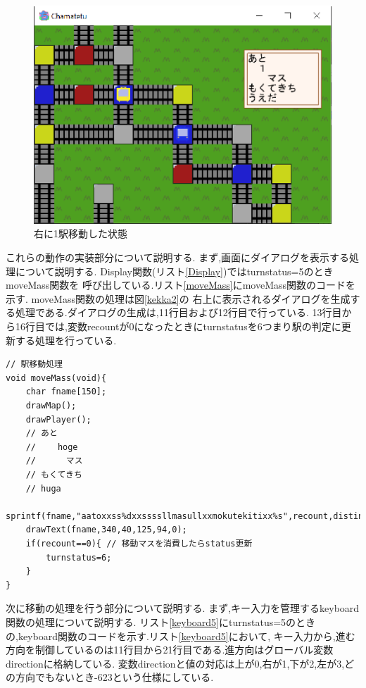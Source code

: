 \documentclass[a4j]{jarticle}
\begin{document}
    \begin{figure}[H]
        \centering
        \includegraphics[scale=1.3]{kekkamigi.eps}
        \caption{右に1駅移動した状態}
         \label{kekkamigi}
        \end{figure} 

    これらの動作の実装部分について説明する. まず,画面にダイアログを表示する処理について説明する. Display関数(リスト\ref{Display})ではturnstatus=5のときmoveMass関数を
    呼び出している.リスト\ref{moveMass}にmoveMass関数のコードを示す. moveMass関数の処理は図\ref{kekka2}の
    右上に表示されるダイアログを生成する処理である.ダイアログの生成は,11行目および12行目で行っている.
    13行目から16行目では,変数recountが0になったときにturnstatusを6つまり駅の判定に更新する処理を行っている.
        \begin{lstlisting}[basicstyle=\ttfamily\footnotesize, frame=single,label=moveMass,caption=moveMass関数]
// 駅移動処理
void moveMass(void){
    char fname[150];
    drawMap();
    drawPlayer();  
    // あと
    // 　　hoge
    // 　　　マス
    // もくてきち
    // huga
    sprintf(fname,"aatoxxss%dxxssssllmasullxxmokutekitixx%s",recount,distination.name);
    drawText(fname,340,40,125,94,0);  
    if(recount==0){ // 移動マスを消費したらstatus更新
        turnstatus=6;
    }
}
        \end{lstlisting}

    次に移動の処理を行う部分について説明する. まず,キー入力を管理するkeyboard関数の処理について説明する.
    リスト\ref{keyboard5}にturnstatus=5のときの,keyboard関数のコードを示す.リスト\ref{keyboard5}において,
    キー入力から,進む方向を制御しているのは11行目から21行目である.進方向はグローバル変数directionに格納している.
    変数directionと値の対応は上が0,右が1,下が2,左が3,どの方向でもないとき-623という仕様にしている.
\end{document}
